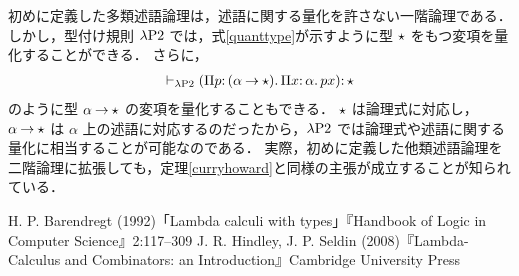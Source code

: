 \documentclass[./main]{subfiles}
\begin{document}
初めに定義した多類述語論理は，述語に関する量化を許さない一階論理である．
しかし，型付け規則 $ \lambda \mathrm{P2} $ では，式\ref{quanttype}が示すように型 $ \mathord{\star} $ をもつ変項を量化することができる．
さらに，
\begin{gather*}
\vdash _{\lambda \mathrm{P2}} (\Pi p \mathord{:}\, (\alpha \mathbin{\to} \mathord{\star}).\, \Pi x \mathord{:}\, \alpha.\, px) \mathord{:}\, \mathord{\star}
\end{gather*}
のように型 $ \alpha \mathbin{\to} \mathord{\star} $ の変項を量化することもできる．
$ \mathord{\star} $ は論理式に対応し，$ \alpha \mathbin{\to} \mathord{\star} $ は $ \alpha $ 上の述語に対応するのだったから，$ \lambda \mathrm{P2} $ では論理式や述語に関する量化に相当することが可能なのである．
実際，初めに定義した他類述語論理を二階論理に拡張しても，定理\ref{curryhoward}と同様の主張が成立することが知られている．


\begin{thebibliography}{9}
 H. P. Barendregt (1992)「Lambda calculi with types」『Handbook of Logic in Computer Science』2:117--309
 J. R. Hindley, J. P. Seldin (2008)『Lambda-Calculus and Combinators: an Introduction』Cambridge University Press
\end{thebibliography}
\end{document}
